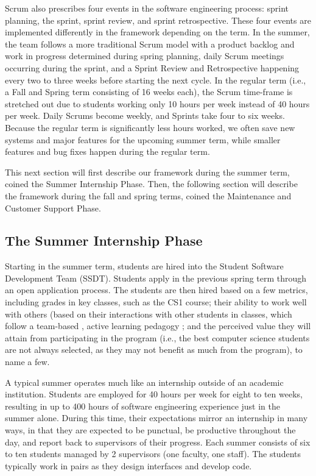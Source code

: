 Scrum also prescribes four events in the software engineering process: sprint planning, the sprint, sprint review, and sprint retrospective. These four events are implemented differently in the framework depending on the term.  In the summer, the team follows a more traditional Scrum model with a product backlog and work in progress determined during spring planning, daily Scrum meetings occurring during the sprint, and a Sprint Review and Retrospective happening every two to three weeks before starting the next cycle. In the regular term (i.e., a Fall and Spring term consisting of 16 weeks each), the Scrum time-frame is stretched out due to students working only 10 hours per week instead of 40 hours per week. Daily Scrums become weekly, and Sprints take four to six weeks. Because the regular term is significantly less hours worked, we often save new systems and major features for the upcoming summer term, while smaller features and bug fixes happen during the regular term.

This next section will first describe our framework during the summer term, coined the Summer Internship Phase. Then, the following section will describe the framework during the fall and spring terms, coined the Maintenance and Customer Support Phase.

\subsection{The Summer Internship Phase}
Starting in the summer term, students are hired into the Student Software Development Team (SSDT). Students apply in the previous spring term through an open application process. The students are then hired based on a few metrics, including grades in key classes, such as the CS1 course; their ability to work well with others (based on their interactions with other students in classes, which follow a team-based \cite{2002PairProgramming}, active learning pedagogy \cite{2012Pogil}; and the perceived value they will attain from participating in the program (i.e., the best computer science students are not always selected, as they may not benefit as much from the program), to name a few.

A typical summer operates much like an internship outside of an academic institution. Students are employed for 40 hours per week for eight to ten weeks, resulting in up to 400 hours of software engineering experience just in the summer alone. During this time, their expectations mirror an internship in many ways, in that they are expected to be punctual, be productive throughout the day, and report back to supervisors of their progress. Each summer consists of six to ten students managed by 2 supervisors (one faculty, one staff). The students typically work in pairs as they design interfaces and develop code.

